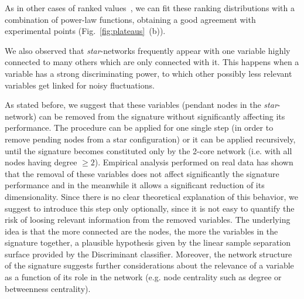 \documentclass{standalone}
\begin{document}
As in other cases of ranked values~\cite{rankfit}, we can fit these ranking distributions with a combination of power-law functions, obtaining a good agreement with experimental points (Fig.~\ref{fig:plateaus}~(b)).

We also observed that \emph{star}-networks frequently appear with one variable highly connected to many others which are only connected with it.
This happens when a variable has a strong discriminating power, to which other possibly less relevant variables get linked for noisy fluctuations.

As stated before, we suggest that these variables (pendant nodes in the \emph{star}-network) can be removed from the signature without significantly affecting its performance.
The procedure can be applied for one single step (in order to remove pending nodes from a star configuration) or it can be applied recursively, until the signature becomes constituted only by the 2-core network (i.e. with all nodes having degree $\geq2$).
Empirical analysis performed on real data has shown that the removal of these variables does not affect significantly the signature performance and in the meanwhile it allows a significant reduction of its dimensionality.
Since there is no clear theoretical explanation of this behavior, we suggest to introduce this step only optionally, since it is not easy to quantify the risk of loosing relevant information from the removed variables.
The underlying idea is that the more connected are the nodes, the more the variables in the signature  together, a plausible hypothesis given by the linear sample separation surface provided by the Discriminant classifier.
Moreover, the network structure of the signature suggests further considerations about the relevance of a variable as a function of its role in the network (e.g. node centrality such as degree or betweenness centrality).
\end{document}
